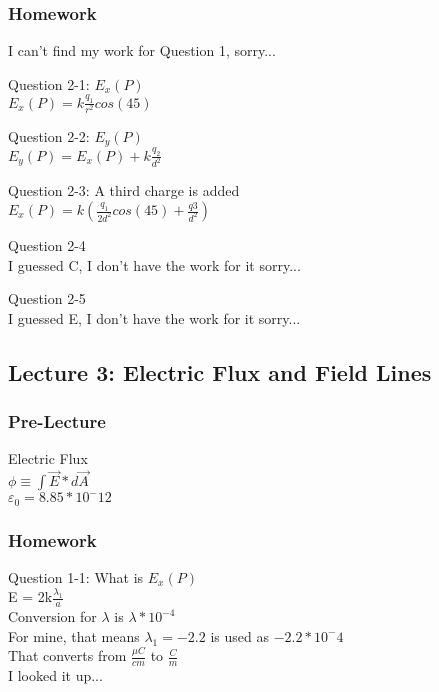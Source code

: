 \documentclass{article}
\begin{document}
\subsubsection{Homework}

\noindent
I can't find my work for Question 1, sorry...

\vspace{2mm}

\noindent
Question 2-1: $E_x(P)$ \\
$E_x(P) = k \frac{q_1}{r^2} cos(45)$

\vspace{2mm}

\noindent
Question 2-2: $E_y(P)$\\
$E_y(P) = E_x(P) + k \frac{q_2}{d^2} $

\vspace{2mm}
Question 2-3: A third charge is added \\
$E_x(P) = k(\frac{q_1}{2d^2} cos(45) + \frac{q3}{d^2}) $

\vspace{2mm}

\noindent
Question 2-4 \\
I guessed C, I don't have the work for it sorry...

\vspace{2mm}

\noindent
Question 2-5 \\
I guessed E, I don't have the work for it sorry...

\subsection{Lecture 3: Electric Flux and Field Lines}

\subsubsection{Pre-Lecture}
\noindent
Electric Flux \\
$\phi \equiv \int \vec{E} * d\vec{A}$ \\
$\varepsilon_0 = 8.85 * 10^-12$

\subsubsection{Homework}

\noindent
Question 1-1: What is $E_x(P)$ \\
E = 2k$\frac{\lambda_1}{a}$ \\
Conversion for $\lambda$ is $\lambda * 10^{-4}$ \\
For mine, that means $\lambda_1 = -2.2$ is used as $-2.2 * 10^-4$ \\
That converts from $\frac{\mu C}{cm}$ to $\frac{C}{m}$ \\
I looked it up...
\end{document}
